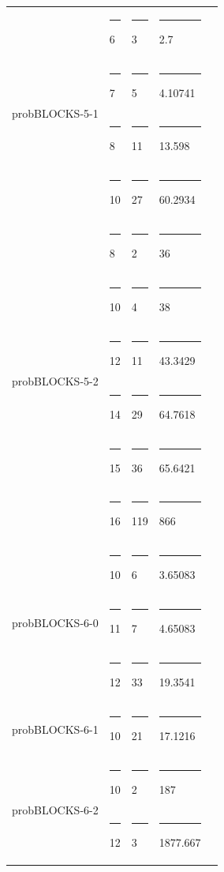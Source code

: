 \documentclass[11pt,a4paper,oneside]{report}
\begin{document}
\begin{longtable}{@{\extracolsep{\fill}} lllll @{}}
\multirow{4}{*}{probBLOCKS-5-1} &\rule{4pt}{0ex} 6         &\rule{4pt}{0ex} 3                &\rule{4pt}{0ex} 2.7         \\ \cline{2-4}
							   &\rule{4pt}{0ex} 7         &\rule{4pt}{0ex} 5                &\rule{4pt}{0ex} 4.10741     \\ \cline{2-4}
							   &\rule{4pt}{0ex} 8         &\rule{4pt}{0ex} 11               &\rule{4pt}{0ex} 13.598      \\ \cline{2-4}
							   &\rule{4pt}{0ex} 10        &\rule{4pt}{0ex} 27               &\rule{4pt}{0ex} 60.2934     \\ \hline
\multirow{6}{*}{probBLOCKS-5-2} &\rule{4pt}{0ex} 8         &\rule{4pt}{0ex} 2                &\rule{4pt}{0ex} 36          \\ \cline{2-4}
                                &\rule{4pt}{0ex} 10        &\rule{4pt}{0ex} 4                &\rule{4pt}{0ex} 38          \\ \cline{2-4}
                                &\rule{4pt}{0ex} 12        &\rule{4pt}{0ex} 11               &\rule{4pt}{0ex} 43.3429     \\ \cline{2-4}
                                &\rule{4pt}{0ex} 14        &\rule{4pt}{0ex} 29               &\rule{4pt}{0ex} 64.7618     \\ \cline{2-4}
                                &\rule{4pt}{0ex} 15        &\rule{4pt}{0ex} 36               &\rule{4pt}{0ex} 65.6421     \\ \cline{2-4}
                                &\rule{4pt}{0ex} 16        &\rule{4pt}{0ex} 119              &\rule{4pt}{0ex} 866         \\ \hline
\multirow{3}{*}{probBLOCKS-6-0} &\rule{4pt}{0ex} 10        &\rule{4pt}{0ex} 6                &\rule{4pt}{0ex} 3.65083    \\ \cline{2-4}
							    &\rule{4pt}{0ex} 11       &\rule{4pt}{0ex} 7                &\rule{4pt}{0ex} 4.65083    \\ \cline{2-4}
								&\rule{4pt}{0ex} 12       &\rule{4pt}{0ex} 33               &\rule{4pt}{0ex} 19.3541    \\ \hline
probBLOCKS-6-1                  &\rule{4pt}{0ex} 10        &\rule{4pt}{0ex} 21               &\rule{4pt}{0ex} 17.1216    \\ \hline
\multirow{10}{*}{probBLOCKS-6-2}&\rule{4pt}{0ex} 10        &\rule{4pt}{0ex} 2               &\rule{4pt}{0ex} 187          \\ \cline{2-4} 
                                &\rule{4pt}{0ex} 12        &\rule{4pt}{0ex} 3               &\rule{4pt}{0ex} 1877.667     \\ \cline{2-4}

\end{longtable}
\end{document}
